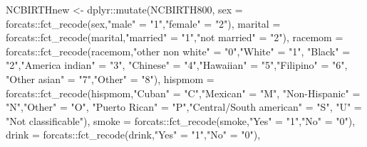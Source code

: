 \documentclass[
]{book}
\newenvironment{Shaded}{\begin{snugshade}}{\end{snugshade}}
\newcommand{\AttributeTok}[1]{\textcolor[rgb]{0.77,0.63,0.00}{#1}}
\newcommand{\FunctionTok}[1]{\textcolor[rgb]{0.00,0.00,0.00}{#1}}
\newcommand{\NormalTok}[1]{#1}
\newcommand{\OtherTok}[1]{\textcolor[rgb]{0.56,0.35,0.01}{#1}}
\newcommand{\SpecialCharTok}[1]{\textcolor[rgb]{0.00,0.00,0.00}{#1}}
\newcommand{\StringTok}[1]{\textcolor[rgb]{0.31,0.60,0.02}{#1}}
\begin{document}
\begin{Shaded}
\begin{Highlighting}[]
\NormalTok{NCBIRTHnew }\OtherTok{\textless{}{-}}\NormalTok{ dplyr}\SpecialCharTok{::}\FunctionTok{mutate}\NormalTok{(NCBIRTH800,      }
              \AttributeTok{sex =}\NormalTok{ forcats}\SpecialCharTok{::}\FunctionTok{fct\_recode}\NormalTok{(sex,}\StringTok{"male"} \OtherTok{=} \StringTok{"1"}\NormalTok{,}\StringTok{"female"} \OtherTok{=} \StringTok{"2"}\NormalTok{),}
              \AttributeTok{marital =}\NormalTok{ forcats}\SpecialCharTok{::}\FunctionTok{fct\_recode}\NormalTok{(marital,}\StringTok{"married"} \OtherTok{=} \StringTok{"1"}\NormalTok{,}\StringTok{"not married"} \OtherTok{=} \StringTok{"2"}\NormalTok{),}
              \AttributeTok{racemom =}\NormalTok{ forcats}\SpecialCharTok{::}\FunctionTok{fct\_recode}\NormalTok{(racemom,}\StringTok{"other non white"} \OtherTok{=} \StringTok{"0"}\NormalTok{,}\StringTok{"White"} \OtherTok{=} \StringTok{"1"}\NormalTok{,}
                                   \StringTok{"Black"} \OtherTok{=} \StringTok{"2"}\NormalTok{,}\StringTok{"America  indian"} \OtherTok{=} \StringTok{"3"}\NormalTok{,}
                                   \StringTok{"Chinese"} \OtherTok{=} \StringTok{"4"}\NormalTok{,}\StringTok{"Hawaiian"} \OtherTok{=} \StringTok{"5"}\NormalTok{,}\StringTok{"Filipino"} \OtherTok{=} \StringTok{"6"}\NormalTok{,}
                                   \StringTok{"Other asian"} \OtherTok{=} \StringTok{"7"}\NormalTok{,}\StringTok{"Other"} \OtherTok{=} \StringTok{"8"}\NormalTok{),}
              \AttributeTok{hispmom =}\NormalTok{ forcats}\SpecialCharTok{::}\FunctionTok{fct\_recode}\NormalTok{(hispmom,}\StringTok{"Cuban"} \OtherTok{=} \StringTok{"C"}\NormalTok{,}\StringTok{"Mexican"} \OtherTok{=} \StringTok{"M"}\NormalTok{,}
                                   \StringTok{"Non{-}Hispanic"} \OtherTok{=} \StringTok{"N"}\NormalTok{,}\StringTok{"Other"} \OtherTok{=} \StringTok{"O"}\NormalTok{,}
                                   \StringTok{"Puerto Rican"} \OtherTok{=} \StringTok{"P"}\NormalTok{,}\StringTok{"Central/South american"} \OtherTok{=} \StringTok{"S"}\NormalTok{,}
                                   \StringTok{"U"} \OtherTok{=} \StringTok{"Not classificable"}\NormalTok{),}
              \AttributeTok{smoke =}\NormalTok{ forcats}\SpecialCharTok{::}\FunctionTok{fct\_recode}\NormalTok{(smoke,}\StringTok{"Yes"} \OtherTok{=} \StringTok{"1"}\NormalTok{,}\StringTok{"No"} \OtherTok{=} \StringTok{"0"}\NormalTok{),}
              \AttributeTok{drink =}\NormalTok{ forcats}\SpecialCharTok{::}\FunctionTok{fct\_recode}\NormalTok{(drink,}\StringTok{"Yes"} \OtherTok{=} \StringTok{"1"}\NormalTok{,}\StringTok{"No"} \OtherTok{=} \StringTok{"0"}\NormalTok{),}

\end{Highlighting}
\end{Shaded}
\end{document}
